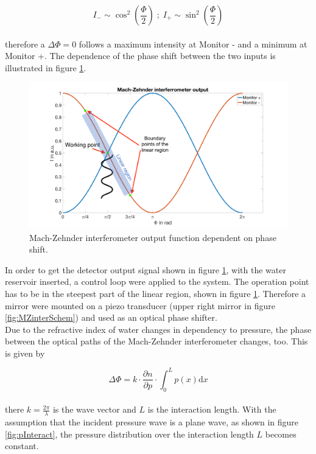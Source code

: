 \begin{equation}
I_- \sim \cos^2\left(\frac{\Phi}{2}\right) \; ;\; I_+ \sim \sin^2\left(\frac{\Phi}{2}\right) 
\label{eq:I+I-}
\end{equation}
\\
therefore a $\Delta\Phi = 0$ follows a maximum intensity at Monitor - and a minimum at Monitor +. The dependence of the phase shift between the two inputs is illustrated in figure \ref{fig:MZoutput}. 

\begin{figure}[H]
	\centering
	\includegraphics[height=0.4\textheight]{05_OUSD/images/MZoutput.png}
	\caption{Mach-Zehnder interferometer output function dependent on phase shift.}
	\label{fig:MZoutput}
\end{figure} 

In order to get the detector output signal shown in figure \ref{fig:MZoutput}, with the water reservoir inserted, a control loop were applied to the system. The operation point has to be in the steepest part of the linear region, shown in figure \ref{fig:MZoutput}. Therefore a mirror were mounted on a piezo transducer (upper right mirror in figure \ref{fig:MZinterSchem}) and used as an optical phase shifter.\\
Due to the refractive index of water changes in dependency to pressure, the phase between the optical paths of the Mach-Zehnder interferometer changes, too. This is given by

\begin{equation}
\Delta\Phi = k \cdot \frac{\partial n}{\partial p} \cdot \int_{0}^{L}p(x)\mathrm{d}x
\label{eq:MZphaseP}
\end{equation}
\\

there $k = \frac{2\pi}{\lambda}$ is the wave vector and $L$ is the interaction length. With the assumption that the incident pressure wave is a plane wave, as shown in figure \ref{fig:pInteract}, the pressure distribution over the interaction length  $L$ becomes constant.

